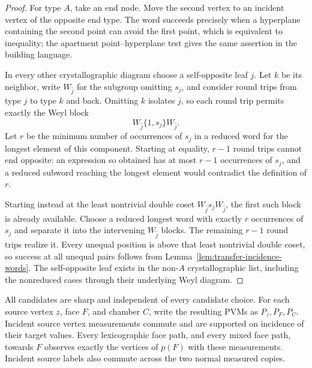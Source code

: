 \begin{proof}
For type $A$, take an end node. Move the second vertex to an incident
vertex of the opposite end type. The word succeeds precisely when a
hyperplane containing the second point can avoid the first point,
which is equivalent to inequality; the apartment point--hyperplane
test gives the same assertion in the building language.

In every other crystallographic diagram choose a self-opposite leaf
$j$. Let $k$ be its neighbor, write $W_{\widehat j}$ for the subgroup
omitting $s_j$, and consider round trips from type $j$ to type $k$
and back. Omitting $k$ isolates $j$, so each round trip permits
exactly the Weyl block
\[
 W_{\widehat j}\{1,s_j\}W_{\widehat j}.
\]
Let $r$ be the minimum number of occurrences of $s_j$ in a reduced
word for the longest element of this component. Starting at equality,
$r-1$ round trips cannot end opposite: an expression so obtained has
at most $r-1$ occurrences of $s_j$, and a reduced subword reaching the
longest element would contradict the definition of $r$.

Starting instead at the least nontrivial double coset
$W_{\widehat j}s_jW_{\widehat j}$, the first such block is already
available. Choose a reduced longest word with exactly $r$ occurrences
of $s_j$ and separate it into the intervening
$W_{\widehat j}$ blocks. The remaining $r-1$ round trips realize it.
Every unequal position is above that least nontrivial double coset,
so success at all unequal pairs follows from
Lemma~\ref{lem:transfer-incidence-words}. The self-opposite leaf exists
in the non-$A$ crystallographic list, including the nonreduced cases
through their underlying Weyl diagram.
\end{proof}

\begin{proposition}
\label{prop:transfer-sharp-flags}
All candidates are sharp and independent of every candidate choice.
For each source vertex $z$, face $F$, and chamber $C$, write the
resulting PVMs as $P_z,P_F,P_C$. Incident source vertex measurements
commute and are supported on incidence of their target values. Every
lexicographic face path, and every mixed face path, towards $F$
observes exactly the vertices of $p(F)$ with these measurements.
Incident source labels also commute across the
two normal measured copies.
\end{proposition}

